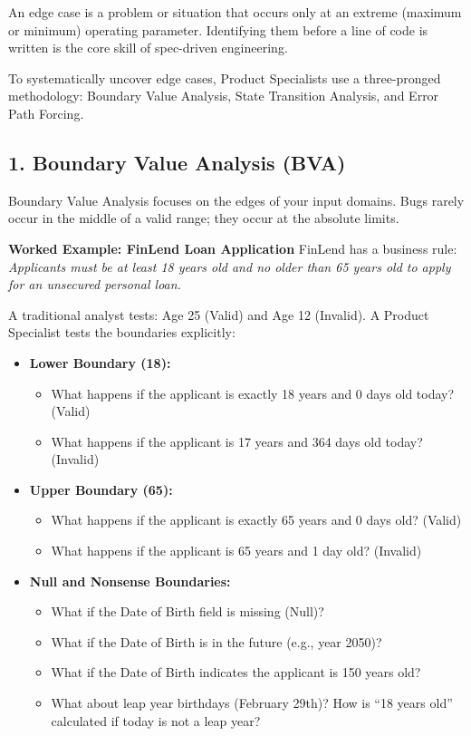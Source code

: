 \documentclass[
  11pt,
  openany,
  oneside]{book}
\providecommand{\tightlist}{%
  \setlength{\itemsep}{0pt}\setlength{\parskip}{0pt}}
\begin{document}
An edge case is a problem or situation that occurs only at an extreme
(maximum or minimum) operating parameter. Identifying them before a line
of code is written is the core skill of spec-driven engineering.

To systematically uncover edge cases, Product Specialists use a
three-pronged methodology: Boundary Value Analysis, State Transition
Analysis, and Error Path Forcing.

\subsection{1. Boundary Value Analysis
(BVA)}\label{boundary-value-analysis-bva}

Boundary Value Analysis focuses on the edges of your input domains. Bugs
rarely occur in the middle of a valid range; they occur at the absolute
limits.

\textbf{Worked Example: FinLend Loan Application} FinLend has a business
rule: \emph{Applicants must be at least 18 years old and no older than
65 years old to apply for an unsecured personal loan.}

A traditional analyst tests: Age 25 (Valid) and Age 12 (Invalid). A
Product Specialist tests the boundaries explicitly:

\begin{itemize}
\tightlist
\item
  \textbf{Lower Boundary (18):}

  \begin{itemize}
  \tightlist
  \item
    What happens if the applicant is exactly 18 years and 0 days old
    today? (Valid)
  \item
    What happens if the applicant is 17 years and 364 days old today?
    (Invalid)
  \end{itemize}
\item
  \textbf{Upper Boundary (65):}

  \begin{itemize}
  \tightlist
  \item
    What happens if the applicant is exactly 65 years and 0 days old?
    (Valid)
  \item
    What happens if the applicant is 65 years and 1 day old? (Invalid)
  \end{itemize}
\item
  \textbf{Null and Nonsense Boundaries:}

  \begin{itemize}
  \tightlist
  \item
    What if the Date of Birth field is missing (Null)?
  \item
    What if the Date of Birth is in the future (e.g., year 2050)?
  \item
    What if the Date of Birth indicates the applicant is 150 years old?
  \item
    What about leap year birthdays (February 29th)? How is ``18 years
    old'' calculated if today is not a leap year?
  \end{itemize}
\end{itemize}
\end{document}
